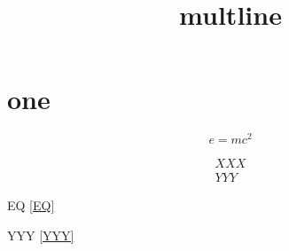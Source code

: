 \documentclass{mcom-l}
\title{multline}
\begin{document}
\maketitle

\section{one}


\begin{equation}\label{EQ}
e = mc^2
\end{equation}

\begin{multline}
  XXX\\YYY\label{YYY}
\end{multline}

EQ \eqref{EQ}

YYY \eqref{YYY}
\end{document}
